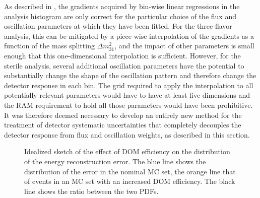 As described in , the gradients acquired by bin-wise linear regressions in the analysis histogram are only correct for the particular choice of the flux and oscillation parameters at which they have been fitted.
For the three-flavor analysis, this can be mitigated by a piece-wise interpolation of the gradients as a function of the mass splitting $\Delta m^2_{31}$, and the impact of other parameters is small enough that this one-dimensional interpolation is sufficient.
However, for the sterile analysis, several additional oscillation parameters have the potential to substantially change the shape of the oscillation pattern and therefore change the detector response in each bin.
The grid required to apply the interpolation to all potentially relevant parameters would have to have at least five dimensions and the RAM requirement to hold all those parameters would have been prohibitive.
It was therefore deemed necessary to develop an entirely new method for the treatment of detector systematic uncertainties that completely decouples the detector response from flux and oscillation weights, as described in this section.
\begin{figure}
    \centering
    
    \caption{Idealized sketch of the effect of DOM efficiency on the distribution of the energy reconstruction error. The blue line shows the distribution of the error in the nominal MC set, the orange line that of events in an MC set with an increased DOM efficiency. The black line shows the ratio between the two PDFs.\label{fig:intuition-sketch}}
\end{figure}
